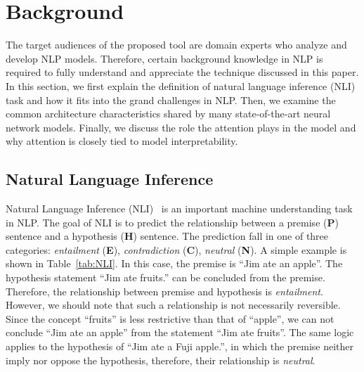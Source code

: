 \section{Background}
The target audiences of the proposed tool are domain experts who analyze and develop NLP models. Therefore, certain background knowledge in NLP is required to fully understand and appreciate the technique discussed in this paper. In this section, we first explain the definition of natural language inference (NLI) task and how it fits into the grand challenges in NLP. Then, we examine the common architecture characteristics shared by many state-of-the-art neural network models. Finally, we discuss the role the attention plays in the model and why attention is closely tied to model interpretability.

\subsection{Natural Language Inference}
\label{sec:languageInference}
Natural Language Inference (NLI)~\cite{DaganRothSammons2013} is an important machine understanding task in NLP.
The goal of NLI is to predict the relationship between a premise (\textbf{P}) sentence and a hypothesis (\textbf{H}) sentence. 
The prediction fall in one of three categories: \emph{entailment} (\textbf{E}), \emph{contradiction} (\textbf{C}), \emph{neutral} (\textbf{N}).
A simple example is shown in Table~\ref{tab:NLI}.
In this case, the premise is ``Jim ate an apple''. 
The hypothesis statement ``Jim ate fruits.'' can be concluded from the premise. Therefore, the relationship between premise and hypothesis is \emph{entailment}. However, we should note that such a relationship is not necessarily reversible. Since the concept ``fruits'' is less restrictive than that of ``apple'', we can not conclude ``Jim ate an apple'' from the statement ``Jim ate fruits''. The same logic applies to the hypothesis of ``Jim ate a Fuji apple.'', in which the premise neither imply nor oppose the hypothesis, therefore, their relationship is \emph{neutral}.

